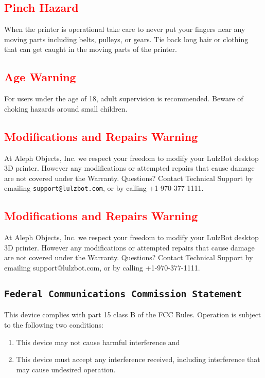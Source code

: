 \subsection{\textcolor{red}{Pinch Hazard}}

When the printer is operational take care to never put your fingers near any moving parts including belts, pulleys, or gears. Tie back long hair or clothing that can get caught in the moving parts of the printer.

\subsection{\textcolor{red}{Age Warning}}

For users under the age of 18, adult supervision is recommended. Beware of choking hazards around small children.

\subsection{\textcolor{red}{Modifications and Repairs Warning}}

At Aleph Objects, Inc. we respect your freedom to modify your LulzBot\textsuperscript{\miniscule{\textregistered}} desktop 3D printer. However any modifications or attempted repairs that cause damage are not covered under the Warranty. Questions? Contact Technical Support by emailing \texttt{support@lulzbot.com}, or by calling +1-970-377-1111.


\subsection{\textcolor{red}{Modifications and Repairs Warning}}

At Aleph Objects, Inc.\textsuperscript{\miniscule{\textregistered}} we respect your freedom to modify your LulzBot desktop 3D printer. However any modifications or attempted repairs that cause damage are not covered under the Warranty. Questions? Contact Technical Support by emailing support@lulzbot.com, or by calling +1-970-377-1111.

\subsection{\texttt{Federal Communications Commission Statement}}
This device complies with part 15 class B of the FCC Rules. Operation is subject to the following two conditions:
\begin{enumerate}
\item This device may not cause harmful interference and
\item This device must accept any interference received, including interference that may cause undesired operation.
\end{enumerate}

